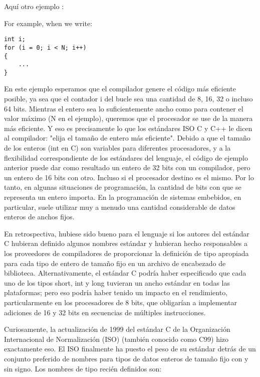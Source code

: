 \documentclass[output=paper, 
colorlinks,
citecolor=brown,
newtxmath
]{langscibook}
\begin{document}
Aquí otro ejemplo :

For example, when we write:

\begin{small}
\begin{verbatim}
int i;
for (i = 0; i < N; i++)
{
	...
}
\end{verbatim}
\end{small}

En este ejemplo esperamos que el compilador genere el código más eficiente posible, 
ya sea que el contador i del bucle sea una cantidad de 8, 16, 32 o incluso 64 bits.
Mientras el entero sea lo suficientemente ancho como para contener el valor máximo 
(N en el ejemplo), queremos que el procesador se use de la manera más eficiente. 
Y eso es precisamente lo que los estándares ISO C y C++ le dicen al compilador: 
"elija el tamaño de entero más eficiente". 
Debido a que el tamaño de los enteros (int en C) son variables para diferentes procesadores, 
y a la flexibilidad correspondiente de los estándares del lenguaje, 
el código de ejemplo anterior puede dar como resultado un entero de 32 bits 
con un compilador, pero un entero de 16 bits con otro. Incluso si el procesador destino es el mismo.
Por lo tanto, en algunas situaciones de programación, la cantidad de bits con que 
se representa un entero importa. 
En la programación de sistemas embebidos, en particular, suele 
utilizar muy a menudo una cantidad considerable de datos enteros 
de anchos fijos.

En retrospectiva, hubiese sido bueno para el lenguaje si los autores del estándar C 
hubieran definido algunos nombres estándar y hubieran hecho responsables a 
los proveedores de compiladores de proporcionar la definición de tipo apropiada 
para cada tipo de entero de tamaño fijo en un archivo de encabezado de biblioteca. 
Alternativamente, el estándar C podría haber especificado que cada uno de los 
tipos short, int y long tuvieran un ancho estándar en todas las plataformas; 
pero eso podría haber tenido un impacto en el rendimiento, 
particularmente en los procesadores de 8 bits, que obligarían a implementar 
adiciones de 16 y 32 bits en secuencias de múltiples instrucciones.

Curiosamente, la actualización de 1999 del estándar C de la Organización 
Internacional de Normalización (ISO) (también conocido como C99) 
hizo exactamente eso. El ISO finalmente ha puesto el peso de su 
estándar detrás de un conjunto preferido de nombres para tipos de datos 
enteros de tamaño fijo con y sin signo. Los nombres de tipo recién definidos son:
\end{document}
